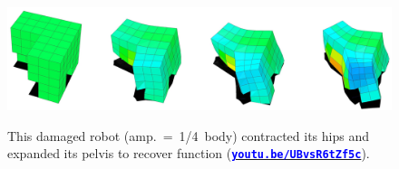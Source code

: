 \begin{figure}[h!]
\begin{center}
\includegraphics[trim={0 0 0 0},clip,width=\linewidth]{Chapter05/fig/splay.jpg}\\
\caption{\label{fig5:splay}
This damaged robot (amp.~=~1/4~body) contracted its hips and expanded its pelvis to recover function
(\href{https://youtu.be/UBvsR6tZf5c}{\textcolor{blue}{\textbf{\texttt{youtu.be/UBvsR6tZf5c}}}}).
}
\vspace{-1em}
\end{center}
\end{figure}